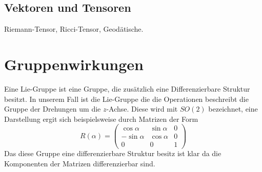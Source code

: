 \subsection{Vektoren und Tensoren}
Riemann-Tensor, Ricci-Tensor, Geodätische.
\section{Gruppenwirkungen}
Eine Lie-Gruppe ist eine Gruppe, die zusätzlich eine Differenzierbare Struktur
besitzt.
In unserem Fall ist die Lie-Gruppe die die Operationen beschreibt die Gruppe der
Drehungen um die $z$-Achse. Diese wird mit $SO(2)$ bezeichnet, eine Darstellung
ergit sich beispielsweise durch Matrizen der Form
\begin{equation}
R(\alpha)=
\begin{pmatrix}
\cos\alpha&\sin\alpha&0\\
-\sin\alpha&\cos\alpha&0\\
0&0&1
\end{pmatrix}
\end{equation}
Das diese Gruppe eine differenzierbare Struktur besitz ist klar da die
Komponenten der Matrizen differenzierbar sind.
\begin{definition}

\end{definition}

